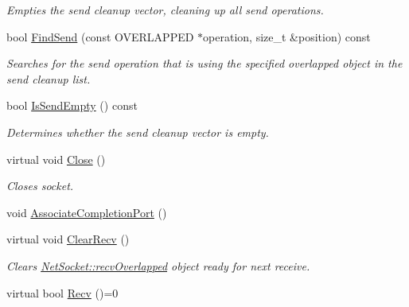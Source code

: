 \begin{DoxyCompactItemize}
\begin{DoxyCompactList}\small\item\em Empties the send cleanup vector, cleaning up all send operations. \item\end{DoxyCompactList}\item 
bool \hyperlink{class_net_socket_a0f18c5b9a572438bb51cd166ae85e573}{FindSend} (const OVERLAPPED $\ast$operation, size\_\-t \&position) const 
\begin{DoxyCompactList}\small\item\em Searches for the send operation that is using the specified overlapped object in the send cleanup list. \item\end{DoxyCompactList}\item 
bool \hyperlink{class_net_socket_a9dad9c9499a245c125ba90fc753592f4}{IsSendEmpty} () const 
\begin{DoxyCompactList}\small\item\em Determines whether the send cleanup vector is empty. \item\end{DoxyCompactList}\item 
virtual void \hyperlink{class_net_socket_a85c6cba30c3a8d780bb24d7af8d0a561}{Close} ()
\begin{DoxyCompactList}\small\item\em Closes socket. \item\end{DoxyCompactList}\item 
void \hyperlink{class_net_socket_aaba0fd1ddc4b4f52751ccb15146aba9a}{AssociateCompletionPort} ()
\item 
virtual void \hyperlink{class_net_socket_ad085ef45c567752aae4457f7945b46aa}{ClearRecv} ()
\begin{DoxyCompactList}\small\item\em Clears \hyperlink{class_net_socket_ac260f690a6f192c22463d1f5ea903d96}{NetSocket::recvOverlapped} object ready for next receive. \item\end{DoxyCompactList}\item 
\hypertarget{class_net_socket_ad6ef9866517f7aad01a69b70467375d5}{
virtual bool \hyperlink{class_net_socket_ad6ef9866517f7aad01a69b70467375d5}{Recv} ()=0}
\label{class_net_socket_ad6ef9866517f7aad01a69b70467375d5}


\end{DoxyCompactItemize}
